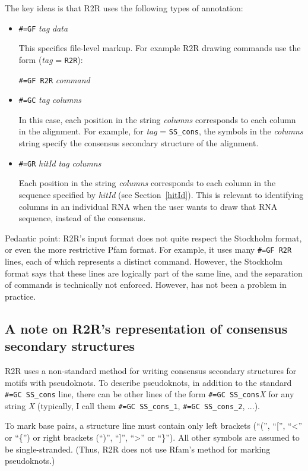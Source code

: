 \documentclass[letterpaper,12pt]{report}
\begin{document}
The key ideas is that R2R uses the following types of annotation:
\begin{itemize}
\item {\tt \#=GF} {\it tag} {\it data}

This specifies file-level markup. For example R2R drawing commands use the form
({\it tag} = {\tt R2R}):

{\tt \#=GF R2R} {\it command}
\item {\tt \#=GC} {\it tag} {\it columns}

In this case, each position in the string {\it columns} corresponds to each column in the alignment.
For example, for {\it tag} = {\tt SS\_cons}, the symbols in the {\it columns} string specify the consensus
secondary structure of the alignment.
\item {\tt \#=GR} {\it hitId} {\it tag} {\it columns}

Each position in the string {\it columns} corresponds to each column in the sequence specified by {\it hitId}
(see Section~\ref{hitId}).
This is relevant to identifying columns in an individual RNA when the user wants to draw that RNA sequence, instead
of the consensus.
\end{itemize}

Pedantic point: R2R's input format does not quite respect the Stockholm format, or even the more restrictive Pfam format.  For example, it uses many {\tt \#=GF R2R} lines, each of which represents a distinct command.  However, the Stockholm format says that these lines are logically part of the same line, and the separation of commands is technically not enforced.  However, has not been a problem in practice.

\subsection{A note on R2R's representation of consensus secondary structures}

R2R uses a non-standard method for writing consensus secondary structures for motifs with pseudoknots.
To describe pseudoknots, in addition to the standard {\tt \#=GC SS\_cons} line, there can be other lines
of the form {\tt \#=GC SS\_cons}{\it X} for any string {\it X} (typically, I call them
{\tt \#=GC SS\_cons\_1}, {\tt \#=GC SS\_cons\_2}, ...).  

To mark base pairs, 
a structure line must contain only left
brackets (``('', ``['', ``\textless{}'' or ``\{'') or right brackets (``)'', ``]'', ``\textgreater{}'' or ``\}'').
All other symbols are assumed to be single-stranded.
(Thus, R2R does not use Rfam's method for marking pseudoknots.)
\end{document}
